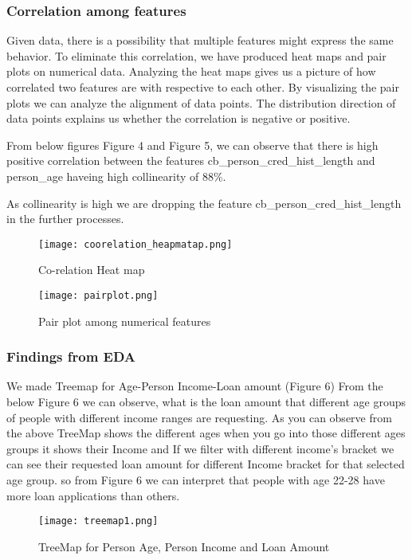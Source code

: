 \documentclass[12pt]{article}
\begin{document}
\subsubsection{Correlation among features}

Given data, there is a possibility that multiple features might express the same behavior. To eliminate this correlation, we have produced heat maps and pair plots on numerical data. Analyzing the heat maps gives us a picture of how correlated two features are with respective to each other. By visualizing the pair plots we can analyze the alignment of data points. The distribution direction of data points explains us whether the correlation is negative or positive.

From below figures Figure 4 and Figure 5, we can observe that there is high positive correlation between the features cb\_person\_cred\_hist\_length and person\_age haveing high collinearity of 88\%. 


As collinearity is high we are dropping the feature cb\_person\_cred\_hist\_length in the further processes.

\begin{figure}[!htb] %
\centering
\texttt{[image: coorelation\_heapmatap.png]}
\caption{Co-relation Heat map}
\end{figure}

\begin{figure}[!htb] %
\centering
\texttt{[image: pairplot.png]}
\caption{Pair plot among numerical features}
\end{figure}




\subsubsection{Findings from EDA}


We made Treemap for Age-Person Income-Loan amount (Figure 6)
From the below Figure 6 we can observe, what is the loan amount that different age groups of people with different income ranges are requesting.
As you can observe from the above TreeMap shows the different ages when you go into those different ages groups it shows their Income and If we filter with different income's bracket we can see their requested loan amount for different Income bracket for that selected age group.
so from Figure 6 we can interpret that people with age 22-28 have more loan applications than others.
\begin{figure}[!h] %
\centering
\texttt{[image: treemap1.png]}
\caption{TreeMap for Person Age, Person Income and Loan Amount}
\end{figure}
\end{document}
